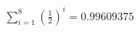 \documentclass[preview]{standalone}
\begin{document}
\begin{align*}
\sum_{i=1}^{8} \left(\frac{1}{2}\right)^i = {0.99609375}
\end{align*}
\end{document}
